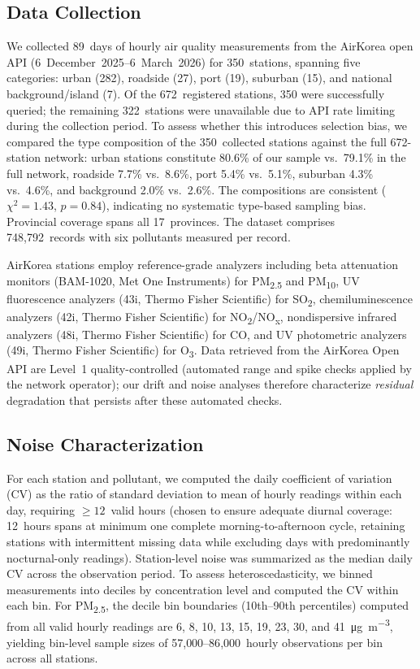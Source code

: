 \documentclass[12pt]{article}
\begin{document}
\subsection{Data Collection}

We collected 89~days of hourly air quality measurements from the AirKorea open API (6~December~2025--6~March~2026) for 350~stations, spanning five categories: urban (282), roadside (27), port (19), suburban (15), and national background/island (7). Of the 672~registered stations, 350 were successfully queried; the remaining 322~stations were unavailable due to API rate limiting during the collection period. To assess whether this introduces selection bias, we compared the type composition of the 350~collected stations against the full 672-station network: urban stations constitute 80.6\% of our sample vs.\ 79.1\% in the full network, roadside 7.7\% vs.\ 8.6\%, port 5.4\% vs.\ 5.1\%, suburban 4.3\% vs.\ 4.6\%, and background 2.0\% vs.\ 2.6\%. The compositions are consistent ($\chi^2 = 1.43$, $p = 0.84$), indicating no systematic type-based sampling bias. Provincial coverage spans all 17~provinces. The dataset comprises 748{,}792~records with six pollutants measured per record.

AirKorea stations employ reference-grade analyzers including beta attenuation monitors (BAM-1020, Met One Instruments) for PM\textsubscript{2.5} and PM\textsubscript{10}, UV fluorescence analyzers (43i, Thermo Fisher Scientific) for SO\textsubscript{2}, chemiluminescence analyzers (42i, Thermo Fisher Scientific) for NO\textsubscript{2}/NO\textsubscript{x}, nondispersive infrared analyzers (48i, Thermo Fisher Scientific) for CO, and UV photometric analyzers (49i, Thermo Fisher Scientific) for O\textsubscript{3}. Data retrieved from the AirKorea Open API are Level~1 quality-controlled (automated range and spike checks applied by the network operator); our drift and noise analyses therefore characterize \emph{residual} degradation that persists after these automated checks.

\subsection{Noise Characterization}

For each station and pollutant, we computed the daily coefficient of variation (CV) as the ratio of standard deviation to mean of hourly readings within each day, requiring ${\geq}12$~valid hours (chosen to ensure adequate diurnal coverage: 12~hours spans at minimum one complete morning-to-afternoon cycle, retaining stations with intermittent missing data while excluding days with predominantly nocturnal-only readings). Station-level noise was summarized as the median daily CV across the observation period. To assess heteroscedasticity, we binned measurements into deciles by concentration level and computed the CV within each bin. For PM\textsubscript{2.5}, the decile bin boundaries (10th--90th percentiles) computed from all valid hourly readings are 6, 8, 10, 13, 15, 19, 23, 30, and 41~\si{\micro\gram\per\meter\cubed}, yielding bin-level sample sizes of 57{,}000--86{,}000~hourly observations per bin across all stations.
\end{document}
